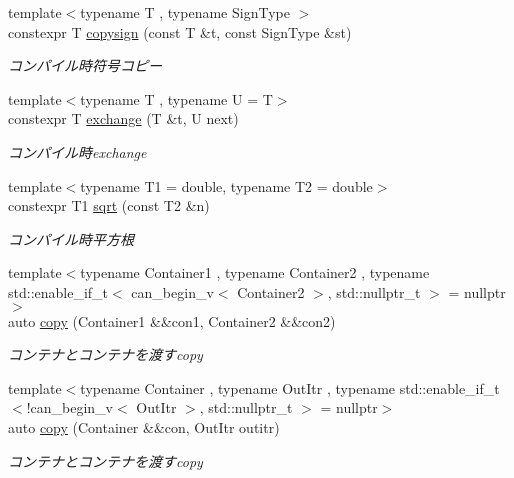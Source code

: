 \begin{DoxyCompactItemize}
{\footnotesize template$<$typename T , typename Sign\+Type $>$ }\\constexpr T \mbox{\hyperlink{namespacesaki_a1791113a346dea4c2d7fd8e120016038}{copysign}} (const T \&t, const Sign\+Type \&st)
\begin{DoxyCompactList}\small\item\em コンパイル時符号コピー \end{DoxyCompactList}\item 
{\footnotesize template$<$typename T , typename U  = T$>$ }\\constexpr T \mbox{\hyperlink{namespacesaki_ad2deeae63db0667c034ff616bf6e3886}{exchange}} (T \&t, U next)
\begin{DoxyCompactList}\small\item\em コンパイル時exchange \end{DoxyCompactList}\item 
{\footnotesize template$<$typename T1  = double, typename T2  = double$>$ }\\constexpr T1 \mbox{\hyperlink{namespacesaki_a1059e80b300067041c754c1686b04dbd}{sqrt}} (const T2 \&n)
\begin{DoxyCompactList}\small\item\em コンパイル時平方根 \end{DoxyCompactList}\item 
{\footnotesize template$<$typename Container1 , typename Container2 , typename std\+::enable\+\_\+if\+\_\+t$<$ can\+\_\+begin\+\_\+v$<$ Container2 $>$, std\+::nullptr\+\_\+t $>$  = nullptr$>$ }\\auto \mbox{\hyperlink{namespacesaki_a469bffdeaee5edab8000f7174b9de5f2}{copy}} (Container1 \&\&con1, Container2 \&\&con2)
\begin{DoxyCompactList}\small\item\em コンテナとコンテナを渡すcopy \end{DoxyCompactList}\item 
{\footnotesize template$<$typename Container , typename Out\+Itr , typename std\+::enable\+\_\+if\+\_\+t$<$!can\+\_\+begin\+\_\+v$<$ Out\+Itr $>$, std\+::nullptr\+\_\+t $>$  = nullptr$>$ }\\auto \mbox{\hyperlink{namespacesaki_a810f851279b6d10acc3892433f7036fd}{copy}} (Container \&\&con, Out\+Itr outitr)
\begin{DoxyCompactList}\small\item\em コンテナとコンテナを渡すcopy \end{DoxyCompactList}\item 

\end{DoxyCompactItemize}

